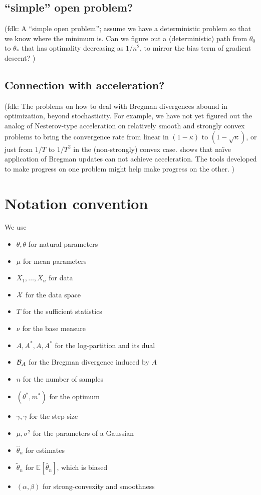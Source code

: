 \documentclass[twoside]{article}
\newcommand{\fdk}[1]{\textcolor{Periwinkle}{(fdk:#1)}}
\newcommand*{\expect}[2][]{\ensuremath{\mathbb{E}_{#1} \left[ #2 \right] }} %
\newcommand{\logpart}{A}
\newcommand{\conj}{{\logpart^*}}
\newcommand{\nat}{\theta}
\newcommand{\m}{\mu}
\newcommand{\lr}{\gamma} %
\newcommand{\stgcvx}{\alpha} %
\newcommand{\smooth}{\beta} %
\begin{document}
\subsection{``simple'' open problem?}
\fdk{
A ``simple open problem'';
assume we have a deterministic problem so that we know where the minimum is.
Can we figure out a (deterministic) path from $\theta_0$ to $\theta_*$
that has optimality decreasing as $1/n^2$,
to mirror the bias term of gradient descent?
}

\subsection{Connection with acceleration?}
\fdk{
The problems on how to deal with Bregman divergences abound in optimization, beyond stochasticity.
For example, we have not yet figured out the analog of Nesterov-type acceleration
on relatively smooth and strongly convex problems
to bring the convergence rate from linear in $(1-\kappa)$ to $(1-\sqrt{\kappa})$,
or just from $1/T$ to $1/T^2$ in the (non-strongly) convex case.
\citet{dragomir2021optimal}  shows that naïve application of Bregman updates can not achieve acceleration.
The tools developed to make progress on one problem might help make progress on the other.
}






\newpage
\section{Notation convention}
We use
\begin{itemize}
	\item $\theta, \nat$ for natural parameters
	\item $\m$ for mean parameters
	\item $X_1,\ldots,X_n$ for data
	\item ${\mathcal X}$ for the data space
	\item $T$ for the sufficient statistics
	\item $\nu$ for the base measure
	\item $A, A^*, \logpart, \conj$ for the log-partition and its dual
	\item ${\mathcal B}_A$ for the Bregman divergence induced by $A$
	\item $n$ for the number of samples
	\item $(\theta^*,m^*)$ for the optimum
	\item $\gamma, \lr$ for the step-size
	\item $\mu,\sigma^2$ for the parameters of a Gaussian
	\item $\hat\theta_n$ for estimates
	\item $\tilde\theta_n$ for $\expect{\hat\theta_n}$, which is biased
	\item $(\stgcvx , \smooth)$ for strong-convexity and smoothness
\end{itemize}
\fi

 
\end{document}
